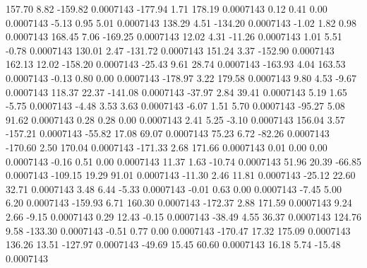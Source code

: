       157.70        8.82     -159.82     0.0007143
     -177.94        1.71      178.19     0.0007143
        0.12        0.41        0.00     0.0007143
       -5.13        0.95        5.01     0.0007143
      138.29        4.51     -134.20     0.0007143
       -1.02        1.82        0.98     0.0007143
      168.45        7.06     -169.25     0.0007143
       12.02        4.31      -11.26     0.0007143
        1.01        5.51       -0.78     0.0007143
      130.01        2.47     -131.72     0.0007143
      151.24        3.37     -152.90     0.0007143
      162.13       12.02     -158.20     0.0007143
      -25.43        9.61       28.74     0.0007143
     -163.93        4.04      163.53     0.0007143
       -0.13        0.80        0.00     0.0007143
     -178.97        3.22      179.58     0.0007143
        9.80        4.53       -9.67     0.0007143
      118.37       22.37     -141.08     0.0007143
      -37.97        2.84       39.41     0.0007143
        5.19        1.65       -5.75     0.0007143
       -4.48        3.53        3.63     0.0007143
       -6.07        1.51        5.70     0.0007143
      -95.27        5.08       91.62     0.0007143
        0.28        0.28        0.00     0.0007143
        2.41        5.25       -3.10     0.0007143
      156.04        3.57     -157.21     0.0007143
      -55.82       17.08       69.07     0.0007143
       75.23        6.72      -82.26     0.0007143
     -170.60        2.50      170.04     0.0007143
     -171.33        2.68      171.66     0.0007143
        0.01        0.00        0.00     0.0007143
       -0.16        0.51        0.00     0.0007143
       11.37        1.63      -10.74     0.0007143
       51.96       20.39      -66.85     0.0007143
     -109.15       19.29       91.01     0.0007143
      -11.30        2.46       11.81     0.0007143
      -25.12       22.60       32.71     0.0007143
        3.48        6.44       -5.33     0.0007143
       -0.01        0.63        0.00     0.0007143
       -7.45        5.00        6.20     0.0007143
     -159.93        6.71      160.30     0.0007143
     -172.37        2.88      171.59     0.0007143
        9.24        2.66       -9.15     0.0007143
        0.29       12.43       -0.15     0.0007143
      -38.49        4.55       36.37     0.0007143
      124.76        9.58     -133.30     0.0007143
       -0.51        0.77        0.00     0.0007143
     -170.47       17.32      175.09     0.0007143
      136.26       13.51     -127.97     0.0007143
      -49.69       15.45       60.60     0.0007143
       16.18        5.74      -15.48     0.0007143
